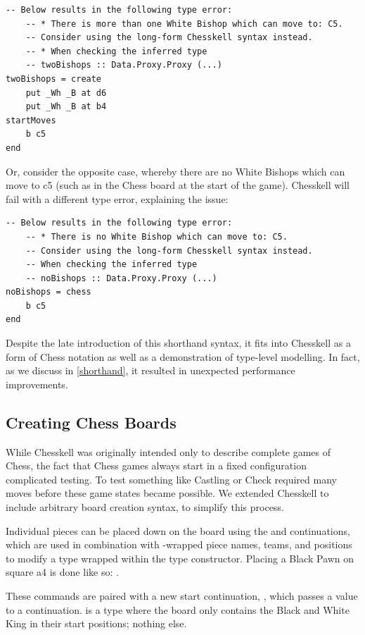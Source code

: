 \begin{lstlisting}
-- Below results in the following type error:
    -- * There is more than one White Bishop which can move to: C5.
    -- Consider using the long-form Chesskell syntax instead.
    -- * When checking the inferred type
    -- twoBishops :: Data.Proxy.Proxy (...)
twoBishops = create
    put _Wh _B at d6
    put _Wh _B at b4
startMoves
    b c5
end
\end{lstlisting}

Or, consider the opposite case, whereby there are no White Bishops which can move to c5 (such as in the Chess board at the start of the game). Chesskell will fail with a different type error, explaining the issue:

\begin{lstlisting}
-- Below results in the following type error:
    -- * There is no White Bishop which can move to: C5.
    -- Consider using the long-form Chesskell syntax instead.
    -- When checking the inferred type
    -- noBishops :: Data.Proxy.Proxy (...)
noBishops = chess
    b c5
end
\end{lstlisting}

Despite the late introduction of this shorthand syntax, it fits into Chesskell as a form of Chess notation as well as a demonstration of type-level modelling. In fact, as we discuss in \cref{shorthand}, it resulted in unexpected performance improvements.

\subsection{Creating Chess Boards} \label{boardcreation}

While Chesskell was originally intended only to describe complete games of Chess, the fact that Chess games always start in a fixed configuration complicated testing. To test something like Castling or Check required many moves before these game states became possible. We extended Chesskell to include arbitrary board creation syntax, to simplify this process.

Individual pieces can be placed down on the board using the  and  continuations, which are used in combination with -wrapped piece names, teams, and positions to modify a  type wrapped within the  type constructor. Placing a Black Pawn on square a4 is done like so: .

These commands are paired with a new start continuation, , which passes a  value to a continuation.  is a  type where the board only contains the Black and White King in their start positions; nothing else.

